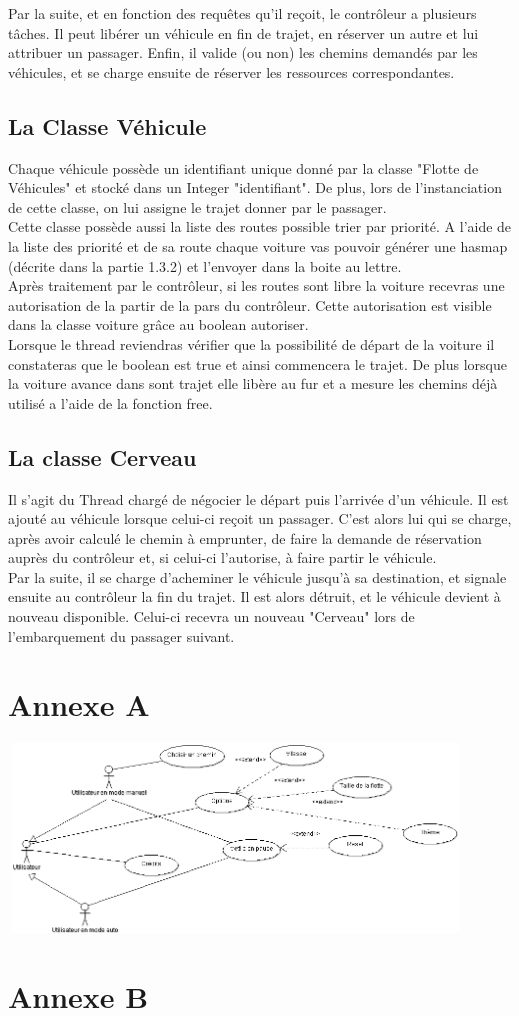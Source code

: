 \documentclass[a4paper, titlepage]{report}
\begin{document}
Par la suite, et en fonction des requêtes qu'il reçoit, le contrôleur a plusieurs tâches. Il peut libérer un véhicule en fin de trajet, en réserver un autre et lui attribuer un passager. Enfin, il valide (ou non) les chemins demandés par les véhicules, et se charge ensuite de réserver les ressources correspondantes.


\section{La Classe Véhicule}

Chaque véhicule possède un identifiant unique donné par la classe "Flotte de Véhicules" et stocké  dans un Integer "identifiant". De plus, lors de l'instanciation de cette classe, on lui assigne le trajet donner par le passager.
\\ Cette classe possède aussi la liste des routes possible trier par priorité. A l'aide de la liste des priorité et de sa route chaque voiture vas pouvoir générer une hasmap (décrite dans la partie 1.3.2) et l'envoyer dans la boite au lettre.
\\
 Après traitement par le contrôleur, si les routes sont libre la voiture recevras une autorisation de la partir de la pars du contrôleur. Cette autorisation est visible dans la classe voiture grâce au boolean autoriser.
\\
Lorsque le thread reviendras vérifier que la possibilité de départ de la voiture il constateras que le boolean est true et ainsi commencera le trajet.
De plus lorsque la voiture avance dans sont trajet elle libère au fur et a mesure les chemins déjà utilisé  a l'aide de la fonction free.

\section{La classe Cerveau}
Il s'agit du Thread chargé de négocier le départ puis l'arrivée d'un véhicule. Il est ajouté au véhicule lorsque celui-ci reçoit un passager. C'est alors lui qui se charge, après avoir calculé le chemin à emprunter, de faire la demande de réservation auprès du contrôleur et, si celui-ci l'autorise, à faire partir le véhicule.\\
Par la suite, il se charge d'acheminer le véhicule jusqu'à sa destination, et signale ensuite au contrôleur la fin du trajet. Il est alors détruit, et le véhicule devient à nouveau disponible. Celui-ci recevra un nouveau "Cerveau" lors de l'embarquement du passager suivant.
\appendix
\chapter*{Annexe A}
\includegraphics[width=455px, height=190px]{Images/CasUtilisation.PNG}
\chapter*{Annexe B}
\end{document}

